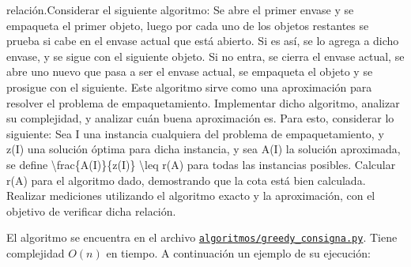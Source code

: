 \documentclass[11pt]{article}
\begin{document}
{{{relación.}{Considerar el siguiente algoritmo: Se abre el primer envase y se empaqueta el primer objeto, luego por cada uno de los objetos restantes se prueba si cabe en el envase actual que está abierto. Si es así, se lo agrega a dicho envase, y se sigue con el siguiente objeto. Si no entra, se cierra el envase actual, se abre uno nuevo que pasa a ser el envase actual, se empaqueta el objeto y se prosigue con el siguiente.   Este algoritmo sirve como una aproximación para resolver el problema de empaquetamiento. Implementar dicho algoritmo, analizar su complejidad, y analizar cuán buena aproximación es. Para esto, considerar lo siguiente: Sea I una instancia cualquiera del problema de empaquetamiento, y z(I) una solución óptima para dicha instancia, y sea A(I) la solución aproximada, se define \textbackslash frac\{A(I)\}\{z(I)\} \textbackslash leq r(A) para todas las instancias posibles. Calcular r(A) para el algoritmo dado, demostrando que la cota está bien calculada. Realizar mediciones utilizando el algoritmo exacto y la aproximación, con el objetivo de verificar dicha relación.}}\label{considerar-el-siguiente-algoritmo-se-abre-el-primer-envase-y-se-empaqueta-el-primer-objeto-luego-por-cada-uno-de-los-objetos-restantes-se-prueba-si-cabe-en-el-envase-actual-que-estuxe1-abierto.-si-es-asuxed-se-lo-agrega-a-dicho-envase-y-se-sigue-con-el-siguiente-objeto.-si-no-entra-se-cierra-el-envase-actual-se-abre-uno-nuevo-que-pasa-a-ser-el-envase-actual-se-empaqueta-el-objeto-y-se-prosigue-con-el-siguiente.-este-algoritmo-sirve-como-una-aproximaciuxf3n-para-resolver-el-problema-de-empaquetamiento.-implementar-dicho-algoritmo-analizar-su-complejidad-y-analizar-cuuxe1n-buena-aproximaciuxf3n-es.-para-esto-considerar-lo-siguiente-sea-i-una-instancia-cualquiera-del-problema-de-empaquetamiento-y-zi-una-soluciuxf3n-uxf3ptima-para-dicha-instancia-y-sea-ai-la-soluciuxf3n-aproximada-se-define-fracaizi-leq-ra-para-todas-las-instancias-posibles.-calcular-ra-para-el-algoritmo-dado-demostrando-que-la-cota-estuxe1-bien-calculada.-realizar-mediciones-utilizando-el-algoritmo-exacto-y-la-aproximaciuxf3n-con-el-objetivo-de-verificar-dicha-relaciuxf3n.}}

    El algoritmo se encuentra en el archivo
\href{algoritmos/greedy_consigna.py}{\texttt{algoritmos/greedy\_consigna.py}}.
Tiene complejidad \(O(n)\) en tiempo. A continuación un ejemplo de su
ejecución:
\end{document}
